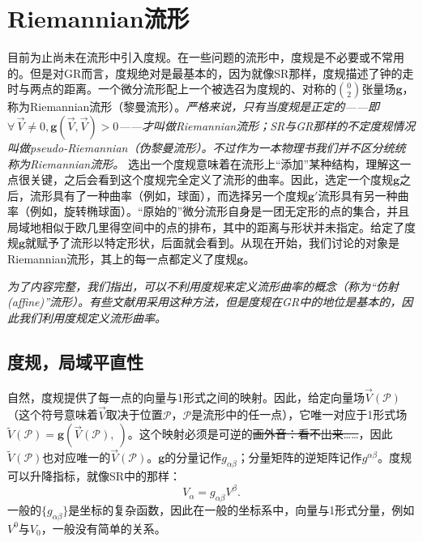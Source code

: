 \section{Riemannian流形}
\label{sec6.2}
目前为止尚未在流形中引入度规。在一些问题的流形中，度规是不必要或不常用的。但是对GR而言，度规绝对是最基本的，因为就像SR那样，度规描述了钟的走时与两点的距离。一个微分流形配上一个被选召为度规的、对称的$\binom{0}{2}$张量场$\bm{g}$，称为Riemannian流形（黎曼流形）。\textit{严格来说，只有当度规是正定的——即$\forall\, \vec{V} \neq 0, \bm{g} (\vec{V}, \vec{V}) > 0$——才叫做Riemannian流形；SR与GR那样的不定度规情况叫做pseudo-Riemannian（伪黎曼流形）。不过作为一本物理书我们并不区分统统称为Riemannian流形。} 选出一个度规意味着在流形上“添加”某种结构，理解这一点很关键，之后会看到这个度规完全定义了流形的曲率。因此，选定一个度规$\bm{g}$之后，流形具有了一种曲率（例如，球面），而选择另一个度规$\bm{g}'$流形具有另一种曲率（例如，旋转椭球面）。“原始的”微分流形自身是一团无定形的点的集合，并且局域地相似于欧几里得空间中的点的排布，其中的距离与形状并未指定。给定了度规$\bm{g}$就赋予了流形以特定形状，后面就会看到。从现在开始，我们讨论的对象是Riemannian流形，其上的每一点都定义了度规$\bm{g}$。

\textit{为了内容完整，我们指出，可以不利用度规来定义流形曲率的概念（称为“仿射 (affine)”流形）。有些文献用采用这种方法，但是度规在GR中的地位是基本的，因此我们利用度规定义流形曲率。}


\subsection*{度规，局域平直性}
自然，度规提供了每一点的向量与1形式之间的映射。因此，给定向量场$\vec{V} (\mathcal{P})$（这个符号意味着$\vec{V}$取决于位置$\mathcal{P}$，$\mathcal{P}$是流形中的任一点），它唯一对应于1形式场$\tilde{V} (\mathcal{P}) = \bm{g} (\vec{V} (\mathcal{P}), \ )$。这个映射必须是可逆的\sout{画外音：看不出来……}，因此$\tilde{V} (\mathcal{P})$也对应唯一的$\vec{V} (\mathcal{P})$。$\bm{g}$的分量记作$g_{\alpha \beta}$；分量矩阵的逆矩阵记作$g^{\alpha \beta}$。度规可以升降指标，就像SR中的那样：
\[
    V_\alpha = g_{\alpha \beta} V^\beta.
\]
一般的$\{ g_{\alpha \beta} \}$是坐标的复杂函数，因此在一般的坐标系中，向量与1形式分量，例如$V^0$与$V_0$，一般没有简单的关系。

